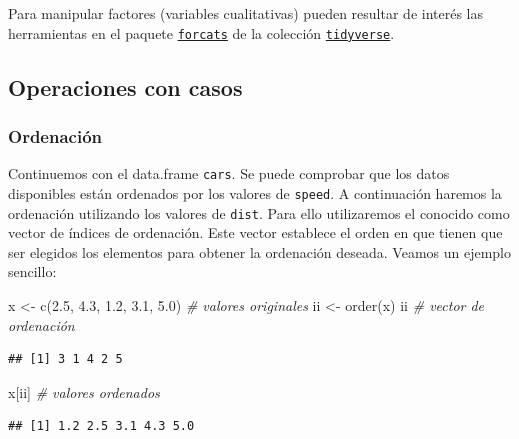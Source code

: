 \documentclass[
]{book}
\newenvironment{Shaded}{\begin{snugshade}}{\end{snugshade}}
\newcommand{\CommentTok}[1]{\textcolor[rgb]{0.56,0.35,0.01}{\textit{#1}}}
\newcommand{\FloatTok}[1]{\textcolor[rgb]{0.00,0.00,0.81}{#1}}
\newcommand{\FunctionTok}[1]{\textcolor[rgb]{0.00,0.00,0.00}{#1}}
\newcommand{\NormalTok}[1]{#1}
\newcommand{\OtherTok}[1]{\textcolor[rgb]{0.56,0.35,0.01}{#1}}
\theoremstyle{break}
\theoremstyle{nonumberplain}
\begin{document}
Para manipular factores (variables cualitativas) pueden resultar de interés las herramientas en el paquete \href{https://forcats.tidyverse.org}{\texttt{forcats}} de la colección \href{https://tidyverse.org}{\texttt{tidyverse}}.

\hypertarget{op-casos}{%
\subsection{Operaciones con casos}\label{op-casos}}

\hypertarget{ordenaciuxf3n}{%
\subsubsection{Ordenación}\label{ordenaciuxf3n}}

Continuemos con el data.frame \texttt{cars}.
Se puede comprobar que los datos disponibles están ordenados por
los valores de \texttt{speed}. A continuación haremos la ordenación utilizando
los valores de \texttt{dist}. Para ello utilizaremos el conocido como vector de
índices de ordenación.
Este vector establece el orden en que tienen que ser elegidos los
elementos para obtener la ordenación deseada.
Veamos un ejemplo sencillo:

\begin{Shaded}
\begin{Highlighting}[]
\NormalTok{x }\OtherTok{\textless{}{-}} \FunctionTok{c}\NormalTok{(}\FloatTok{2.5}\NormalTok{, }\FloatTok{4.3}\NormalTok{, }\FloatTok{1.2}\NormalTok{, }\FloatTok{3.1}\NormalTok{, }\FloatTok{5.0}\NormalTok{) }\CommentTok{\# valores originales}
\NormalTok{ii }\OtherTok{\textless{}{-}} \FunctionTok{order}\NormalTok{(x)}
\NormalTok{ii    }\CommentTok{\# vector de ordenación}
\end{Highlighting}
\end{Shaded}

\begin{verbatim}
## [1] 3 1 4 2 5
\end{verbatim}

\begin{Shaded}
\begin{Highlighting}[]
\NormalTok{x[ii] }\CommentTok{\# valores ordenados}
\end{Highlighting}
\end{Shaded}

\begin{verbatim}
## [1] 1.2 2.5 3.1 4.3 5.0
\end{verbatim}
\end{document}
